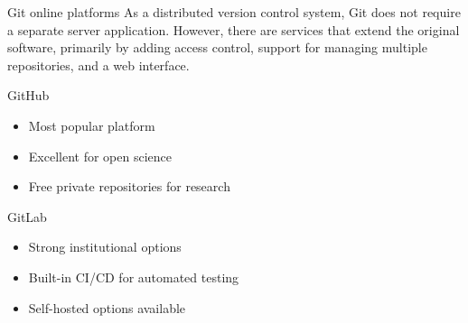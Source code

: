 \documentclass[aspectratio=1609]{beamer}
\begin{document}
    \begin{frame}{Git online platforms}
        \justifying As a distributed version control system, Git does not require a separate server application. However, there are services that extend the original software, primarily by adding access control, support for managing multiple repositories, and a web interface.
        \begin{tblock}{GitHub}
        \begin{itemize}
            \item Most popular platform
            \item Excellent for open science
            \item Free private repositories for research
        \end{itemize}
        \end{tblock}
        \begin{tblock}{GitLab}
            \begin{itemize}
                \item Strong institutional options
                \item Built-in CI/CD for automated testing
                \item Self-hosted options available
            \end{itemize}
        \end{tblock}
    \end{frame}
\end{document}
